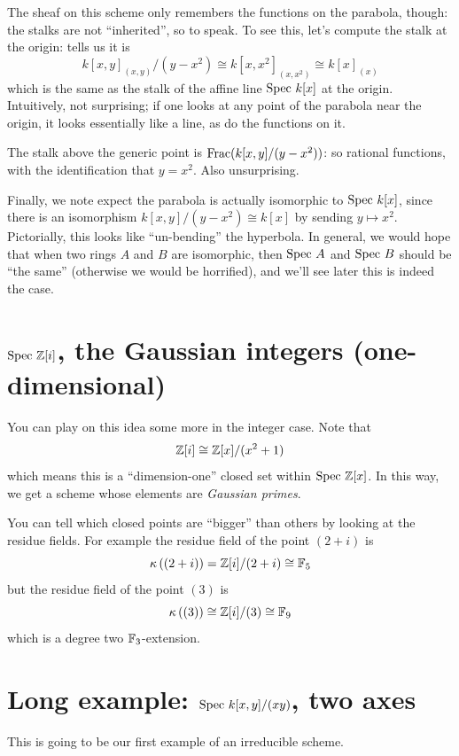 The sheaf on this scheme only remembers the functions
on the parabola, though: the stalks are not ``inherited'', so to speak.
To see this, let's compute the stalk at the origin:
 tells us it is
\[ k[x,y]_{(x,y)} / (y-x^2)
	\cong k[x,x^2]_{(x,x^2)}
	\cong k[x]_{(x)} \]
which is the same as the stalk
of the affine line $\text{Spec } k[x]$ at the origin.
Intuitively, not surprising;
if one looks at any point of the parabola near the origin,
it looks essentially like a line,
as do the functions on it.

The stalk above the generic point is $\operatorname{Frac}(k[x,y] / (y-x^2))$:
so rational functions, with the identification that $y = x^2$.
Also unsurprising.

Finally, we note expect the parabola is actually isomorphic to $\text{Spec } k[x]$,
since there is an isomorphism $k[x,y] / (y-x^2) \cong k[x]$
by sending $y \mapsto x^2$.
Pictorially, this looks like ``un-bending'' the hyperbola.
In general, we would hope that when two rings $A$ and $B$ are isomorphic,
then $\text{Spec } A$ and $\text{Spec } B$ should be ``the same''
(otherwise we would be horrified),
and we'll see later this is indeed the case.

\section{$\text{Spec } \mathbb Z[i]$, the Gaussian integers (one-dimensional)}
You can play on this idea some more in the integer case.
Note that \[ \mathbb Z[i] \cong \mathbb Z[x] / (x^2+1) \]
which means this is a ``dimension-one'' closed set within $\text{Spec } \mathbb Z[x]$.
In this way, we get a scheme whose elements are \emph{Gaussian primes}.

You can tell which closed points are ``bigger'' than others
by looking at the residue fields.
For example the residue field of the point $(2+i)$ is
\[ \kappa\left( (2+i) \right) = \mathbb Z[i] / (2+i) \cong \mathbb F_5 \]
but the residue field of the point $(3)$ is 
\[ \kappa\left( (3) \right) \cong \mathbb Z[i] / (3) \cong \mathbb F_9 \]
which is a degree two $\mathbb F_3$-extension.

\section{Long example: $\text{Spec } k[x,y]/(xy)$, two axes}
This is going to be our first example of an irreducible scheme.


